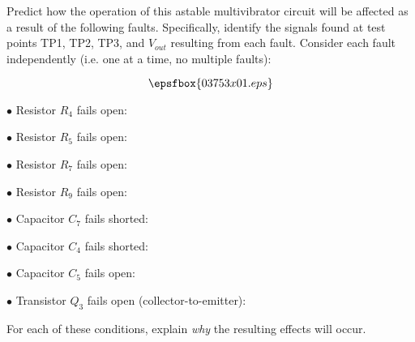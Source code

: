 

Predict how the operation of this astable multivibrator circuit will be affected as a result of the following faults.  Specifically, identify the signals found at test points TP1, TP2, TP3, and $V_{out}$ resulting from each fault.  Consider each fault independently (i.e. one at a time, no multiple faults):

$$\epsfbox{03753x01.eps}$$

\medskip
\item{$\bullet$} Resistor $R_4$ fails open:
\vskip 5pt
\item{$\bullet$} Resistor $R_5$ fails open:
\vskip 5pt
\item{$\bullet$} Resistor $R_7$ fails open:
\vskip 5pt
\item{$\bullet$} Resistor $R_9$ fails open:
\vskip 5pt
\item{$\bullet$} Capacitor $C_7$ fails shorted:
\vskip 5pt
\item{$\bullet$} Capacitor $C_4$ fails shorted:
\vskip 5pt
\item{$\bullet$} Capacitor $C_5$ fails open:
\vskip 5pt
\item{$\bullet$} Transistor $Q_3$ fails open (collector-to-emitter):
\medskip

For each of these conditions, explain {\it why} the resulting effects will occur.







